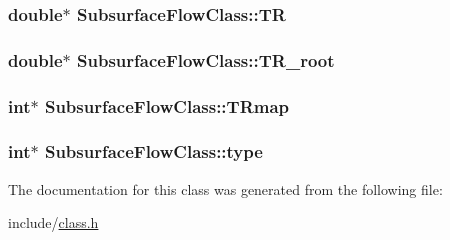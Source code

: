 \subsubsection[{\texorpdfstring{TR}{TR}}]{\setlength{\rightskip}{0pt plus 5cm}double$\ast$ Subsurface\+Flow\+Class\+::\+TR}\hypertarget{class_subsurface_flow_class_a8d02452fa0d497e798d3e490bfb9d6d4}{}\label{class_subsurface_flow_class_a8d02452fa0d497e798d3e490bfb9d6d4}
\subsubsection[{\texorpdfstring{T\+R\+\_\+root}{TR_root}}]{\setlength{\rightskip}{0pt plus 5cm}double$\ast$ Subsurface\+Flow\+Class\+::\+T\+R\+\_\+root}\hypertarget{class_subsurface_flow_class_ab1dbf63ff09d6b99ab59281f9d22a4b3}{}\label{class_subsurface_flow_class_ab1dbf63ff09d6b99ab59281f9d22a4b3}
\subsubsection[{\texorpdfstring{T\+Rmap}{TRmap}}]{\setlength{\rightskip}{0pt plus 5cm}int$\ast$ Subsurface\+Flow\+Class\+::\+T\+Rmap}\hypertarget{class_subsurface_flow_class_aef6ead42cc81c5b49d0d8d64fbd0db39}{}\label{class_subsurface_flow_class_aef6ead42cc81c5b49d0d8d64fbd0db39}
\subsubsection[{\texorpdfstring{type}{type}}]{\setlength{\rightskip}{0pt plus 5cm}int$\ast$ Subsurface\+Flow\+Class\+::type}\hypertarget{class_subsurface_flow_class_ae9ccc23f4e2723b0db19a9b7f57452b7}{}\label{class_subsurface_flow_class_ae9ccc23f4e2723b0db19a9b7f57452b7}


The documentation for this class was generated from the following file\+:\begin{DoxyCompactItemize}
\item 
include/\hyperlink{class_8h}{class.\+h}\end{DoxyCompactItemize}
